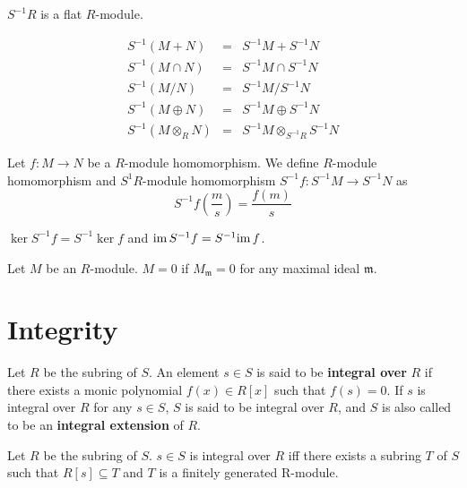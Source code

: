 \documentclass[12pt]{book}
\begin{document}
	\begin{corollary}
		$S^{-1}R$ is a flat $R$-module.
	\end{corollary}
	
	\begin{lemma}
		\begin{eqnarray}
			S^{-1}(M+N)&=&S^{-1}M+S^{-1}N\\
			S^{-1}(M\cap N)&=&S^{-1}M\cap S^{-1}N\\
			S^{-1}(M/N)&=&S^{-1}M/S^{-1}N\\
			S^{-1}(M\oplus N)&=&S^{-1}M\oplus S^{-1}N\\
			S^{-1}(M\otimes_R N)&=&S^{-1}M\otimes_{S^{-1}R}S^{-1}N
		\end{eqnarray}
	\end{lemma}
	
	\begin{definition}
		Let $f:M\rightarrow N$ be a $R$-module homomorphism. We define $R$-module homomorphism and $S^{1}R$-module homomorphism $S^{-1}f:S^{-1}M\rightarrow S^{-1}N$ as
		\begin{equation}
			S^{-1}f(\frac ms)=\frac {f(m)}s
		\end{equation}
	\end{definition}
	
	\begin{lemma}
		$\ker S^{-1}f=S^{-1}\ker f$ and ${\rm im}\, S^{-1}f=S^{-1}{\rm im}\, f$.
	\end{lemma}
	
	\begin{theorem}
		Let $M$ be an $R$-module. $M=0$ if $M_{\mathfrak m}=0$ for any maximal ideal $\mathfrak m$.
	\end{theorem}
	
	\section{Integrity}
	\begin{definition}
		Let $R$ be the subring of $S$. An element $s\in S$ is said to be {\bf integral over} $R$ if there exists a monic polynomial $f(x)\in R[x]$ such that $f(s)=0$. If $s$ is integral over $R$ for any $s\in S$, $S$ is said to be integral over $R$, and $S$ is also called to be an {\bf integral extension} of $R$.
	\end{definition}
	
	\begin{lemma}
		Let $R$ be the subring of $S$. $s\in S$ is integral over $R$ iff there exists a subring $T$ of $S$ such that $R[s]\subseteq T$ and $T$ is a finitely generated R-module.
	\end{lemma}
	
\end{document}
